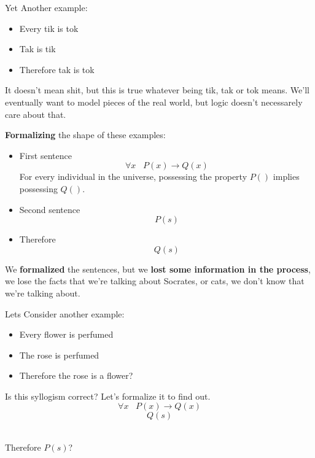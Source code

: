 	\begin{example} Yet Another example:
	\begin{itemize}
		\item Every tik is tok
		\item Tak is tik
		\\ \bline
		\item Therefore tak is tok
	\end{itemize}
	\end{example}

	It doesn't mean shit, but this is true whatever being tik, tak or tok means.
	We'll eventually want to model pieces of the real world, but logic doesn't necessarely care about that. \\

	\newpage

	\textbf{Formalizing} the shape of these examples:
	\begin{itemize}
		\item First sentence
		$$ \forall x \;\;\;  P(x) \rightarrow Q(x) $$
			For every individual in the universe, possessing the property \( P() \) implies possessing \( Q() \). \smallvspace

		\item Second sentence
		$$ P(s) $$

		\item Therefore
		$$ Q(s) $$
	\end{itemize}

	We \textbf{formalized} the sentences, but we \textbf{lost some information in the process}, we lose the facts that we're talking about Socrates, or cats, we don't know that we're talking about.

	\begin{example} Lets Consider another example:
	\begin{itemize}
		\item Every flower is perfumed
		\item The rose is perfumed
		\\ \bline
		\item Therefore the rose is a flower?
	\end{itemize}
	\end{example}

	Is this syllogism correct? Let's formalize it to find out. \\
	$$\forall x\;\;\; P(x) \rightarrow Q(x)$$
	$$Q(s)$$
	\begin{center}
		\bline \\
		Therefore $P(s)$? \\
	\end{center}


